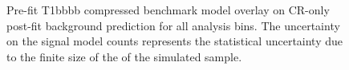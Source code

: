 \begin{figure}[h!]
\begin{center}
{            \label{fig:T1bbbb_compressed_MR_4j}
        } \\
         ~~
         \\
        \caption{
            Pre-fit T1bbbb compressed benchmark model overlay on CR-only
            post-fit background prediction for all analysis bins. The
            uncertainty on the signal model counts represents the statistical
            uncertainty due to the finite size of the of the simulated sample.
        }
        \label{fig:T1bbbb_compressed_MR}
    \end{center}
\end{figure}

